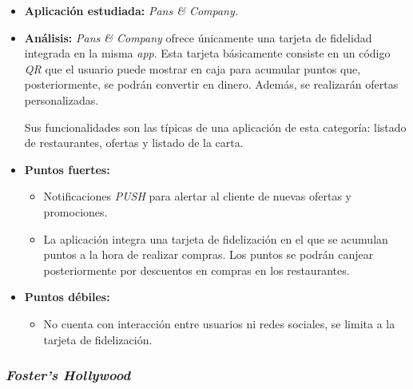 \documentclass[twoside]{report}
\begin{document}
\begin{itemize}
\item \textbf{Aplicación estudiada:} \cite{pansapp} \textit{Pans \& Company.}
\item \textbf{Análisis:} 
\textit{Pans \& Company} ofrece únicamente una tarjeta de fidelidad integrada en la misma \textit{app}. Esta tarjeta básicamente consiste en un código \textit{QR} que el usuario puede mostrar en caja para acumular puntos que, posteriormente, se podrán convertir en dinero. Además, se realizarán ofertas personalizadas.

Sus funcionalidades son las típicas de una aplicación de esta categoría: listado de restaurantes, ofertas y listado de la carta.
\item \textbf{Puntos fuertes:}
	\begin{itemize}
	\item Notificaciones \textit{PUSH} para alertar al cliente de nuevas ofertas y promociones.
	\item La aplicación integra una tarjeta de fidelización en el que se acumulan puntos a la hora de realizar compras. Los puntos se podrán canjear posteriormente por descuentos en compras en los restaurantes.
	\end{itemize}
\item \textbf{Puntos débiles:}
	\begin{itemize}
	\item No cuenta con interacción entre usuarios ni redes sociales, se limita a la tarjeta de fidelización.
	\end{itemize}
\end{itemize}

\subsubsection{\textit{Foster's Hollywood}}
\end{document}
